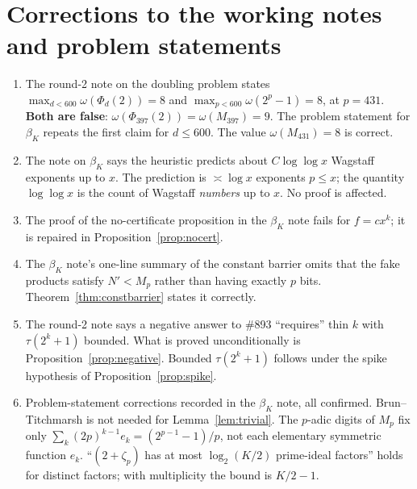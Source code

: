 \documentclass[11pt]{amsart}
\theoremstyle{definition}
\theoremstyle{remark}
\begin{document}
\section{Corrections to the working notes and problem statements}\label{sec:errata}
\begin{enumerate}
\item The round-2 note on the doubling problem states $\max_{d<600}\omega(\Phi_d(2))=8$ and
$\max_{p<600}\omega(2^p-1)=8$, at $p=431$. \textbf{Both are false}: $\omega(\Phi_{397}(2))=\omega(M_{397})=9$. The
problem statement for $\beta_K$ repeats the first claim for $d\le600$. The value $\omega(M_{431})=8$ is correct.
\item The note on $\beta_K$ says the heuristic predicts about $C\log\log x$ Wagstaff exponents up to $x$. The
prediction is $\asymp\log x$ exponents $p\le x$; the quantity $\log\log x$ is the count of Wagstaff \emph{numbers} up to
$x$. No proof is affected.
\item The proof of the no-certificate proposition in the $\beta_K$ note fails for $f=cx^k$; it is repaired in
Proposition~\ref{prop:nocert}.
\item The $\beta_K$ note's one-line summary of the constant barrier omits that the fake products satisfy $N'<M_p$
rather than having exactly $p$ bits. Theorem~\ref{thm:constbarrier} states it correctly.
\item The round-2 note says a negative answer to \#893 ``requires'' thin $k$ with $\tau(2^k+1)$ bounded. What is
proved unconditionally is Proposition~\ref{prop:negative}. Bounded $\tau(2^k+1)$ follows under the spike hypothesis of
Proposition~\ref{prop:spike}.
\item Problem-statement corrections recorded in the $\beta_K$ note, all confirmed. Brun--Titchmarsh is not needed for
Lemma~\ref{lem:trivial}. The $p$-adic digits of $M_p$ fix only $\sum_k(2p)^{k-1}e_k=(2^{p-1}-1)/p$, not each
elementary symmetric function $e_k$. ``$(2+\zeta_p)$ has at most $\log_2(K/2)$ prime-ideal factors'' holds for distinct
factors; with multiplicity the bound is $K/2-1$.
\end{enumerate}

\end{document}
